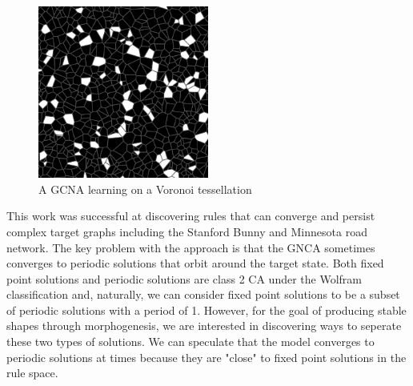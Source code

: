 \begin{figure}[!h]
    \centering
    \includegraphics[width=0.5\textwidth]{images/voronoi.png}
    \caption{A GCNA learning on a Voronoi tessellation \cite{grattarola2021learning}}
    \label{fig:voronoi}
\end{figure}

This work was successful at discovering rules that can converge and persist complex target graphs including the Stanford Bunny \cite{turk} and Minnesota road network.
The key problem with the approach is that the GNCA sometimes converges to periodic solutions that orbit around the target state. 
Both fixed point solutions and periodic solutions are class 2 CA under the Wolfram classification and, naturally, we can consider fixed point solutions to be a subset of periodic solutions with a period of 1.
However, for the goal of producing stable shapes through morphogenesis, we are interested in discovering ways to seperate these two types of solutions.
We can speculate that the model converges to periodic solutions at times because they are "close" to fixed point solutions in the rule space.